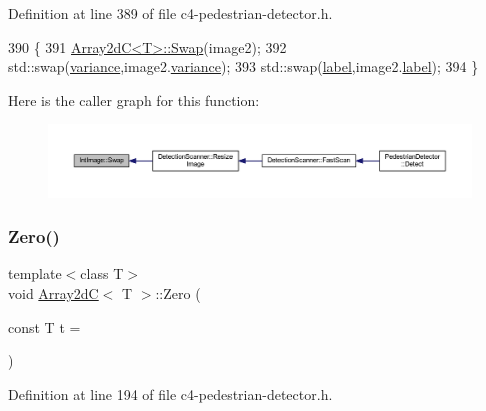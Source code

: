 Definition at line 389 of file c4-\/pedestrian-\/detector.\+h.


\begin{DoxyCode}
390 \{
391     \mbox{\hyperlink{class_array2d_c_ae8cbeb3e4fdc3a45cc188ecc1b317919}{Array2dC<T>::Swap}}(image2);
392     std::swap(\mbox{\hyperlink{class_int_image_a2da0267dc732e9e4149e70a05f744fb6}{variance}},image2.\mbox{\hyperlink{class_int_image_a2da0267dc732e9e4149e70a05f744fb6}{variance}});
393     std::swap(\mbox{\hyperlink{class_int_image_aeeeaa5da82f21cdc95ab3f941aa405e7}{label}},image2.\mbox{\hyperlink{class_int_image_aeeeaa5da82f21cdc95ab3f941aa405e7}{label}});
394 \}
\end{DoxyCode}
Here is the caller graph for this function\+:\nopagebreak
\begin{figure}[H]
\begin{center}
\leavevmode
\includegraphics[width=350pt]{class_int_image_adc366f59865cefd440c01996fd42d59a_icgraph}
\end{center}
\end{figure}
\mbox{\label{class_array2d_c_a5e1d7837fd208699694fc3fc97151df0}} 
\subsubsection{\texorpdfstring{Zero()}{Zero()}}
{\footnotesize\ttfamily template$<$class T$>$ \\
void \mbox{\hyperlink{class_array2d_c}{Array2dC}}$<$ T $>$\+::Zero (\begin{DoxyParamCaption}\item[{const T}]{t = {} }\end{DoxyParamCaption})\hspace{0.3cm}{\ttfamily [inherited]}}



Definition at line 194 of file c4-\/pedestrian-\/detector.\+h.


